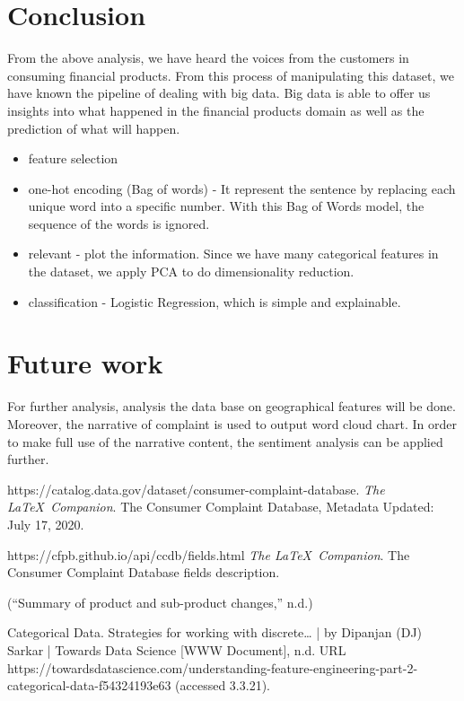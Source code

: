 \documentclass[conference]{IEEEtran}
\begin{document}
\section{Conclusion }

From the above analysis, we have heard the voices from the customers in consuming financial products. From this process of manipulating this dataset, we have known the pipeline of dealing with big data. Big data is able to offer us insights into what happened in the financial products domain as well as the prediction of what will happen. 


\begin{itemize}
\item feature selection
\item one-hot encoding (Bag of words) - It represent the sentence by replacing each unique word into a specific number. With this Bag of Words model, the sequence of the words is ignored.
\item relevant - plot the information. Since we have many categorical features in the dataset, we  apply PCA to do dimensionality reduction. 
\item classification - Logistic Regression, which is simple and explainable. 
\end{itemize}

\section{Future work}
For further analysis, analysis the data base on geographical features will be done. Moreover, the narrative of complaint is used to output word cloud chart. In order to make full use of the narrative content, the sentiment analysis can be applied further. 


\begin{thebibliography}{9}
https://catalog.data.gov/dataset/consumer-complaint-database. 
\textit{The \LaTeX\ Companion}. 
The Consumer Complaint Database, Metadata Updated: July 17, 2020.

https://cfpb.github.io/api/ccdb/fields.html
\textit{The \LaTeX\ Companion}. 
The Consumer Complaint Database fields description.

(“Summary of product and sub-product changes,” n.d.) 

Categorical Data. Strategies for working with discrete… | by Dipanjan (DJ) Sarkar | Towards Data Science [WWW Document], n.d. URL https://towardsdatascience.com/understanding-feature-engineering-part-2-categorical-data-f54324193e63 (accessed 3.3.21).

\end{thebibliography}
\end{document}
